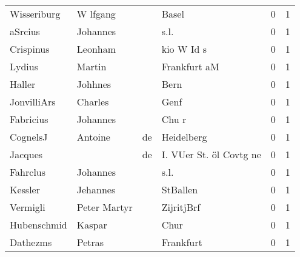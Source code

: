 \documentclass[10pt,a4paper,landscape]{article}
\begin{document}
\begin{longtable}{llllrr}
              Wisseriburg &                           W lfgang &             &                                       Basel &          0 &         1 \\
                  aSrcius &                           Johannes &             &                                        s.l. &          0 &         1 \\
                Crispinus &                            Leonham &             &                                  kio W Id s &          0 &         1 \\
                   Lydius &                             Martin &             &                                Frankfurt aM &          0 &         1 \\
                   Haller &                            Johhnes &             &                                        Bern &          0 &         1 \\
              JonvilliArs &                            Charles &             &                                        Genf &          0 &         1 \\
                Fabricius &                           Johannes &             &                                       Chu r &          0 &         1 \\
                 CognelsJ &                            Antoine &          de &                                  Heidelberg &          0 &         1 \\
                  Jacques &                                    &          de &                     I. VUer St. öl Covtg ne &          0 &         1 \\
                 Fahrclus &                           Johannes &             &                                        s.l. &          0 &         1 \\
                  Kessler &                           Jehannes &             &                                    StBallen &          0 &         1 \\
                 Vermigli &                       Peter Martyr &             &                                  ZijritjBrf &          0 &         1 \\
              Hubenschmid &                             Kaspar &             &                                        Chur &          0 &         1 \\
                 Dathezms &                             Petras &             &                                   Frankfurt &          0 &         1 \\

\end{longtable}
\end{document}
